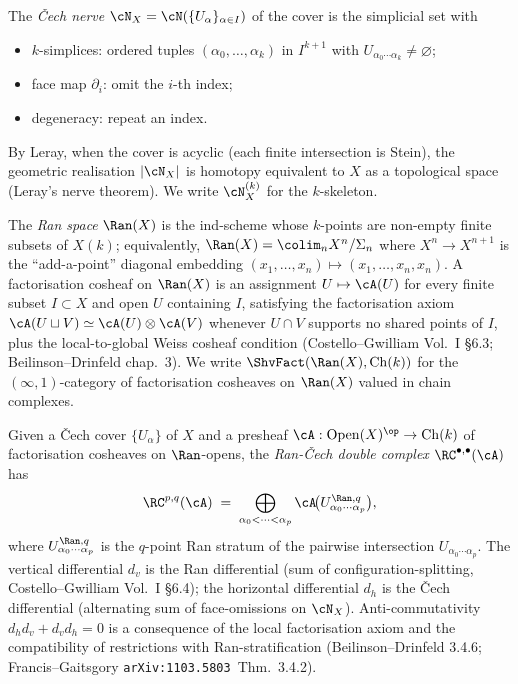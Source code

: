 \begin{definition}
\label{def:cech-nerve}
The \emph{\v{C}ech nerve} $\cN_X = \cN(\{U_\alpha\}_{\alpha \in I})$ of
the cover is the simplicial set with
\begin{itemize}
\item $k$-simplices: ordered tuples $(\alpha_0, \ldots, \alpha_k)$ in
  $I^{k+1}$ with $U_{\alpha_0 \cdots \alpha_k} \neq \varnothing$;
\item face map $\partial_i$: omit the $i$-th index;
\item degeneracy: repeat an index.
\end{itemize}
By Leray, when the cover is acyclic (each finite intersection is
Stein), the geometric realisation $|\cN_X|$ is homotopy equivalent to
$X$ as a topological space (Leray's nerve theorem). We write
$\cN_X^{(k)}$ for the $k$-skeleton.
\end{definition}

\begin{definition}
\label{def:ran-space-chiral}
The \emph{Ran space} $\Ran(X)$ is the ind-scheme whose $k$-points are
non-empty finite subsets of $X(k)$; equivalently,
$\Ran(X) = \colim_{n} X^n / \Sigma_n$ where $X^n \to X^{n+1}$ is the
``add-a-point'' diagonal embedding $(x_1, \ldots, x_n) \mapsto
(x_1, \ldots, x_n, x_n)$. A factorisation cosheaf on $\Ran(X)$ is an
assignment $U \mapsto \cA(U)$ for every finite subset $I \subset X$
and open $U$ containing $I$, satisfying the factorisation axiom
$\cA(U \sqcup V) \simeq \cA(U) \otimes \cA(V)$ whenever $U \cap V$
supports no shared points of $I$, plus the local-to-global Weiss
cosheaf condition (Costello--Gwilliam Vol.~I \S 6.3; Beilinson--Drinfeld
chap.~3). We write $\ShvFact(\Ran(X), \mathrm{Ch}(k))$ for the
$(\infty,1)$-category of factorisation cosheaves on $\Ran(X)$ valued
in chain complexes.
\end{definition}

\begin{definition}
\label{def:ran-cech-double}
Given a \v{C}ech cover $\{U_\alpha\}$ of $X$ and a presheaf
$\cA: \mathrm{Open}(X)^{\op} \to \mathrm{Ch}(k)$ of factorisation
cosheaves on $\Ran$-opens, the \emph{Ran-\v{C}ech double complex}
$\RC^{\bullet, \bullet}(\cA)$ has
\[
  \RC^{p, q}(\cA) \;=\;
  \bigoplus_{\alpha_0 < \cdots < \alpha_p}
  \cA\!\bigl(U_{\alpha_0 \cdots \alpha_p}^{\Ran, q}\bigr),
\]
where $U_{\alpha_0 \cdots \alpha_p}^{\Ran, q}$ is the $q$-point Ran
stratum of the pairwise intersection
$U_{\alpha_0 \cdots \alpha_p}$. The vertical differential $d_v$ is
the Ran differential (sum of configuration-splitting, Costello--Gwilliam
Vol.~I \S 6.4); the horizontal differential $d_h$ is the \v{C}ech
differential (alternating sum of face-omissions on $\cN_X$).
Anti-commutativity $d_h d_v + d_v d_h = 0$ is a consequence of the
local factorisation axiom and the compatibility of restrictions with
Ran-stratification (Beilinson--Drinfeld 3.4.6; Francis--Gaitsgory
\texttt{arXiv:1103.5803}~Thm.~3.4.2).
\end{definition}

